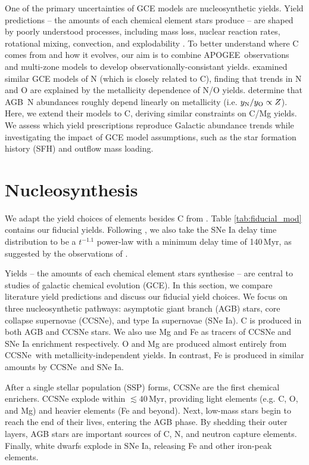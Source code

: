 \documentclass[fleqn,
usenatbib]{mnras}
\newcommand{\agb}{AGB}
\newcommand{\apogee}{APOGEE}
\newcommand{\cc}{CCSNe}
\newcommand{\gce}{GCE}
\newcommand{\ia}{SNe Ia}
\newcommand{\sfh}{SFH} %
\begin{document}
One of the primary uncertainties of GCE models are nucleosynthetic yields. Yield predictions -- the amounts of each chemical element stars produce --
are shaped by poorly understood processes, including mass loss, nuclear reaction rates, rotational mixing, convection, and explodability \citep{romano+10,KL14,ventura+13, LC18, emily+21}.
To better understand where C comes from and how it evolves, our aim is to combine \apogee\ observations and multi-zone models to develop observationally-consistant yields.
\cite{james+23} examined similar \gce{} models of N (which is closely related to C), finding that trends in N and O are explained by the metallicity dependence of N/O yields. \citet{james+23} determine that \agb\ N abundances roughly depend linearly on metallicity (i.e. $y_{\rm N}/y_{\rm O} \propto Z$). 
Here, we extend their models to C, deriving similar constraints on C/Mg yields. We assess which yield prescriptions reproduce Galactic abundance trends while investigating the impact of \gce{} model assumptions, such as the star formation history (\sfh{}) and outflow mass loading.







\section{Nucleosynthesis}
We adapt the yield choices of elements besides C from \citet{james+21, james+23}.
Table \ref{tab:fiducial_mod} contains our fiducial yields. 
Following \citet{james+21, james+23}, we also take the \ia{} delay time distribution to be a $t^{-1.1}$ power-law with a minimum delay time of 140\,Myr, as suggested by the observations of \citet{maoz+12}.


Yields -- the amounts of each chemical element stars synthesise -- are central to studies of galactic chemical evolution (GCE). 
In this section, we compare literature yield predictions and discuss our fiducial yield choices. 
We focus on three nucleosynthetic pathways: asymptotic giant branch (\agb{}) stars, core collapse supernovae (\cc{}), and type Ia supernovae (\ia{}).
C is produced in both \agb{} and \cc{} stars.
We also use Mg and Fe as tracers of \cc{} and \ia{} enrichment respectively. 
O and Mg are produced almost entirely from \cc\ with metallicity-independent yields. In contrast, Fe is produced in similar amounts by \cc\ and \ia.

After a single stellar population (SSP)\footnotemark{} forms, \cc{} are the first chemical enrichers. \cc{} explode within $\lesssim 40$\,Myr, providing light elements (e.g. C, O, and Mg) and heavier elements (Fe and beyond). Next, low-mass stars begin to reach the end of their lives, entering the \agb{} phase. By shedding their outer layers, \agb{} stars are important sources of C, N, and neutron capture elements.  Finally, white dwarfs explode in \ia{}, releasing Fe and other iron-peak elements.
\end{document}
